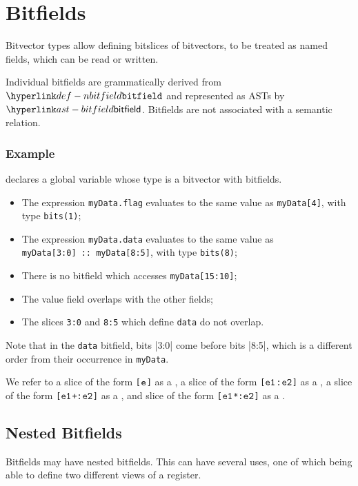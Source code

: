 \chapter{Bitfields\label{chap:Bitfields}}

Bitvector types allow defining bitslices of bitvectors, to be treated as named
fields, which can be read or written. 

Individual bitfields are grammatically derived from $\Nbitfield$ and represented as ASTs by $\bitfield$.
Bitfields are not associated with a semantic relation.

\subsection{Example}
 declares a global variable whose type is a bitvector with bitfields.
\begin{itemize}
  \item The expression \texttt{myData.flag} evaluates to the same value as \verb|myData[4]|, with type \verb|bits(1)|;
  \item The expression \texttt{myData.data} evaluates to the same value as \\
        \verb|myData[3:0] :: myData[8:5]|, with type \verb|bits(8)|;
  \item There is no bitfield which accesses \verb|myData[15:10]|;
  \item The value field overlaps with the other fields;
  \item The slices \verb|3:0| and \verb|8:5| which define \texttt{data} do not overlap.
\end{itemize}
Note that in the \texttt{data} bitfield, bits |3:0| come before bits |8:5|,
which is a different order from their occurrence in \texttt{myData}.

\hypertarget{def-singleslice}{}
\hypertarget{def-rangeslice}{}
\hypertarget{def-lengthslice}{}
\hypertarget{def-scaledslice}{}
We refer to a slice of the form \texttt{[$\texttt{e}$]} as a \singleslice,
a slice of the form \texttt{[$\texttt{e1}$:$\texttt{e2}$]} as a \rangeslice,
a slice of the form \texttt{[$\texttt{e1}$+:$\texttt{e2}$]} as a \lengthslice,
and slice of the form \texttt{[$\texttt{e1}$*:$\texttt{e2}$]} as a \scaledslice.

\section{Nested Bitfields}
Bitfields may have nested bitfields. This can have several uses, one of which being able to define two
different views of a register.

